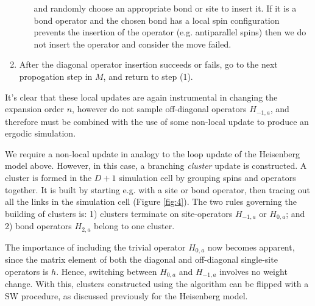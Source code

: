 \documentclass[vecphys]{svmult}
\begin{document}
\begin{enumerate}
\begin{enumerate}
and randomly choose an appropriate bond or site to insert it.
If it is a bond operator and the chosen bond has a local spin configuration prevents the insertion of the operator (e.g. antiparallel spins) then we do not insert the operator and consider the move failed.
\end{enumerate}
\item After the diagonal operator insertion succeeds or fails,  go to the next propogation step in $M$, and return to step (1).
\end{enumerate}
It's clear that these local updates are again instrumental in changing the expansion order $n$, however do not sample off-diagonal operators $H_{-1,a}$, and therefore must be combined with the use of some non-local update to produce an ergodic simulation.

We require a non-local update in analogy to the loop update of the Heisenberg model above.  However, in this case, a branching {\it cluster} update is constructed.  A cluster is formed in the $D+1$ simulation cell by grouping spins and operators together.  It is built by starting e.g. with a site or bond operator, then tracing out all the links in the simulation cell (Figure \ref{fig:4}).  The two rules governing the building of clusters is: 1) clusters terminate on site-operators $H_{-1,a}$ or $H_{0,a}$; and 2) bond operators $H_{2,a}$ belong to one cluster.

The importance of including the trivial operator $H_{0,a}$ now becomes apparent, since the matrix element of both the diagonal and off-diagonal single-site operators is $h$.  Hence, switching between $H_{0,a}$ and $H_{-1,a}$ involves no weight change.  With this, clusters constructed using the algorithm can be flipped with a SW procedure, as discussed previously for the Heisenberg model.
\end{document}
